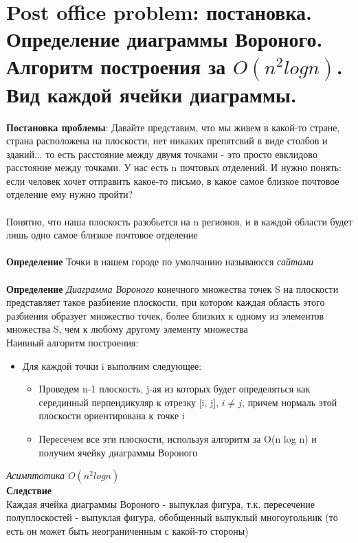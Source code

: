 \section{Post office problem: постановка. Определение диаграммы Вороного. Алгоритм построения за $O(n^2log n)$. Вид каждой ячейки диаграммы.}
\textbf{Постановка проблемы}: Давайте представим, что мы живем в какой-то стране, страна расположена на плоскости, нет никаких препятсвий в виде столбов и зданий... то есть расстояние между двумя точками - это просто евклидово расстояние между точками. У нас есть n почтовых отделений. И нужно понять: если человек хочет отправить какое-то письмо, в какое самое близкое почтовое отделение ему нужно пройти?
\\
\\
Понятно, что наша плоскость разобьется на n регионов, и в каждой области будет лишь одно самое близкое почтовое отделение
\\
\\
\textbf{Определение} Точки в нашем городе по умолчанию называюсся \textit{сайтами}
\\
\\
\textbf{Определение} \textit{Диаграмма Вороного} конечного множества точек S на плоскости представляет такое разбиение плоскости, при котором каждая область этого разбиения образует множество точек, более близких к одному из элементов множества S, чем к любому другому элементу множества
\\
Наивный алгоритм построения:
\begin{itemize}
    \item Для каждой точки i выполним следующее:
    \begin{itemize}
        \item Проведем n-1 плоскость, j-ая из которых будет определяться как серединный перпендикуляр к отрезку [i, j], $i \neq j$, причем нормаль этой плоскости ориентирована к точке i
        \item Пересечем все эти плоскости, используя алгоритм за O(n log n) и получим ячейку диаграммы Вороного
    \end{itemize}
\end{itemize}
\textit{Асимптотика $O(n^2 logn)$}
\\
\textbf{Следствие} \\ Каждая ячейка диаграммы Вороного - выпуклая фигура, т.к. пересечение полуплоскостей - выпуклая фигура, обобщенный выпуклый многоугольник (то есть он может быть неограниченным с какой-то стороны)
\newpage{}

